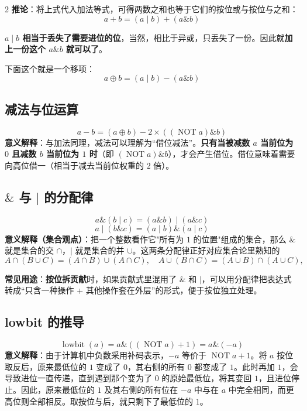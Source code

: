 \begin{multicols*}{2}
		\textbf{推论}：将上式代入加法等式，可得两数之和也等于它们的按位或与按位与之和：
		$$a + b = (a \mathbin{|} b) + (a \mathbin{\&} b)$$

		\textbf{$a \mathbin{|} b$ 相当于丢失了需要进位的位}，当然，相比于异或，只丢失了一份。因此就\textbf{加上一份这个 $a \mathbin{\&} b$ 就可以了}。

		下面这个就是一个移项：
		$$a \oplus b = (a \mathbin{|} b) - (a \mathbin{\&} b)$$

		\subsection{减法与位运算}
		$$a - b = (a \oplus b) - 2 \times ((\operatorname{NOT} a) \mathbin{\&} b)$$
		\textbf{意义解释}：与加法同理，减法可以理解为“借位减法”。\textbf{只有当被减数 $a$ 当前位为 $0$ 且减数 $b$ 当前位为 $1$ 时}（即 $(\operatorname{NOT} a) \mathbin{\&} b$），才会产生借位。借位意味着需要向高位借一（相当于减去当前位权重的 $2$ 倍）。

		\subsection{\texorpdfstring{$\mathbin{\&}$ 与 $\mathbin{|}$}{\& 与 |} 的分配律}
		$$a \mathbin{\&} (b \mathbin{|} c) = (a \mathbin{\&} b) \mathbin{|} (a \mathbin{\&} c)$$
		$$a \mathbin{|} (b \mathbin{\&} c) = (a \mathbin{|} b) \mathbin{\&} (a \mathbin{|} c)$$
		\textbf{意义解释（集合观点）}：把一个整数看作它"所有为 $1$ 的位置"组成的集合，那么 $\mathbin{\&}$ 就是集合的交 $\cap$，$\mathbin{|}$ 就是集合的并 $\cup$。这两条分配律正好对应集合论里熟知的
		$$A \cap (B \cup C) = (A \cap B) \cup (A \cap C), \quad A \cup (B \cap C) = (A \cup B) \cap (A \cup C),$$


		\textbf{常见用途}：\textbf{按位拆贡献}时，如果贡献式里混用了 $\mathbin{\&}$ 和 $\mathbin{|}$，可以用分配律把表达式转成“只含一种操作 + 其他操作套在外层”的形式，便于按位独立处理。

		\subsection{lowbit 的推导}
		$$\operatorname{lowbit}(a) = a \mathbin{\&} ((\operatorname{NOT} a) + 1) = a \mathbin{\&} (-a)$$
		\textbf{意义解释}：由于计算机中负数采用补码表示，$-a$ 等价于 $\operatorname{NOT} a + 1$。将 $a$ 按位取反后，原来最低位的 $1$ 变成了 $0$，其右侧的所有 $0$ 都变成了 $1$。此时再加 $1$，会导致进位一直传递，直到遇到那个变为了 $0$ 的原始最低位，将其变回 $1$，且进位停止。因此，原来最低位的 $1$ 及其右侧的所有位在 $-a$ 中与在 $a$ 中完全相同，而更高位则全部相反。取按位与后，就只剩下了最低位的 $1$。


\end{multicols*}
